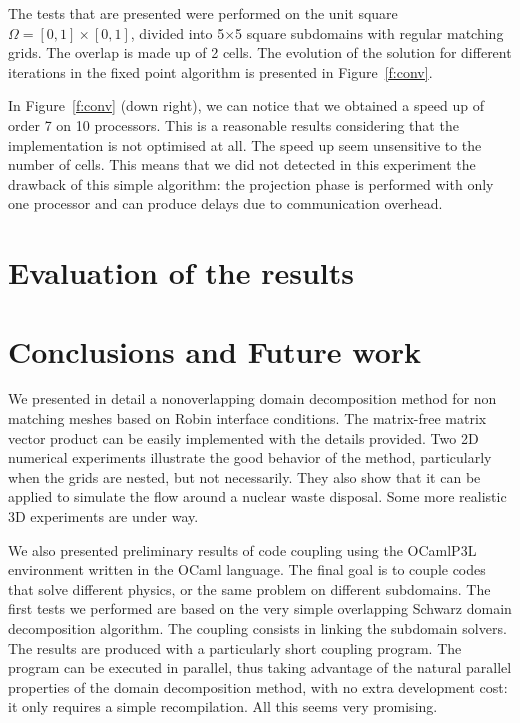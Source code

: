 \documentclass{article}
\begin{document}
The tests that are presented were performed on the unit square
$\Omega=[0,1]\times[0,1]$, divided into 5$\times$5 square subdomains with
regular matching grids. The overlap is made up of 2 cells. The evolution of the
solution for different iterations in the fixed point algorithm is presented in
Figure~\ref{f:conv}.

In Figure~\ref{f:conv} (down right), we can notice that we obtained a
speed up of order 7 on 10 processors. This is a reasonable results
considering that the implementation is not optimised at all. The speed
up seem unsensitive to the number of cells. This means that we did not
detected in this experiment the drawback of this simple algorithm: the
projection phase is performed with only one processor and can produce
delays due to communication overhead.

\section{Evaluation of the results}
%


\section{Conclusions and Future work}
%

We presented in detail a nonoverlapping domain decomposition method for non
matching meshes based on Robin interface conditions. The matrix-free matrix
vector product can be easily implemented with the details provided. 
Two 2D numerical experiments illustrate the good
behavior of the method, particularly when the grids are nested, but not
necessarily. They also show that it can be applied to simulate the flow around
a nuclear waste disposal. Some more realistic 3D experiments are under way.

We also presented preliminary results of code coupling using the OCamlP3L
environment written in the OCaml language. The final goal is to couple codes
that solve different physics, or the same problem on different subdomains. The
first tests we performed are based on the very simple overlapping Schwarz
domain decomposition algorithm. The coupling consists in linking the subdomain
solvers. The results are produced with a particularly short coupling program.
The program can be executed in parallel, thus taking advantage of the natural
parallel properties of the domain decomposition method, with no extra
development cost: it only requires a simple recompilation. All this seems very
promising.
\end{document}
